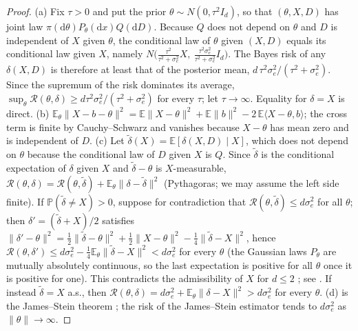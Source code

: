 \documentclass[10pt,a4paper]{article}
\theoremstyle{plain}
\theoremstyle{definition}
\theoremstyle{remark}
\newcommand{\E}{\mathbb{E}}
\newcommand{\Prob}{\mathbb{P}}
\newcommand{\risk}{\mathcal{R}}
\newcommand{\norm}[1]{\lVert #1\rVert}
\newcommand{\ip}[1]{\langle #1\rangle}
\newcommand{\dd}{\mathrm{d}}
\begin{document}
\begin{proof}
(a) Fix $\tau>0$ and put the prior $\theta\sim N(0,\tau^2 I_d)$, so that $(\theta,X,D)$ has joint law $\pi(\dd\theta)P_\theta(\dd x)Q(\dd D)$. Because $Q$ does not depend on $\theta$ and $D$ is independent of $X$ given $\theta$, the conditional law of $\theta$ given $(X,D)$ equals its conditional law given $X$, namely $N\big(\tfrac{\tau^2}{\tau^2+\sigma_e^2}X,\ \tfrac{\tau^2\sigma_e^2}{\tau^2+\sigma_e^2}I_d\big)$. The Bayes risk of any $\delta(X,D)$ is therefore at least that of the posterior mean, $d\,\tau^2\sigma_e^2/(\tau^2+\sigma_e^2)$. Since the supremum of the risk dominates its average, $\sup_\theta\risk(\theta,\delta)\ge d\tau^2\sigma_e^2/(\tau^2+\sigma_e^2)$ for every $\tau$; let $\tau\to\infty$. Equality for $\delta=X$ is direct.
(b) $\E_\theta\norm{X-b-\theta}^2=\E\norm{X-\theta}^2+\E\norm{b}^2-2\,\E\ip{X-\theta,b}$; the cross term is finite by Cauchy--Schwarz and vanishes because $X-\theta$ has mean zero and is independent of $D$.
(c) Let $\tilde\delta(X)=\E[\delta(X,D)\mid X]$, which does not depend on $\theta$ because the conditional law of $D$ given $X$ is $Q$. Since $\tilde\delta$ is the conditional expectation of $\delta$ given $X$ and $\tilde\delta-\theta$ is $X$-measurable, $\risk(\theta,\delta)=\risk(\theta,\tilde\delta)+\E_\theta\norm{\delta-\tilde\delta}^2$ (Pythagoras; we may assume the left side finite). If $\Prob(\tilde\delta\ne X)>0$, suppose for contradiction that $\risk(\theta,\tilde\delta)\le d\sigma_e^2$ for all $\theta$; then $\delta'=(\tilde\delta+X)/2$ satisfies $\norm{\delta'-\theta}^2=\tfrac12\norm{\tilde\delta-\theta}^2+\tfrac12\norm{X-\theta}^2-\tfrac14\norm{\tilde\delta-X}^2$, hence $\risk(\theta,\delta')\le d\sigma_e^2-\tfrac14\E_\theta\norm{\tilde\delta-X}^2<d\sigma_e^2$ for every $\theta$ (the Gaussian laws $P_\theta$ are mutually absolutely continuous, so the last expectation is positive for all $\theta$ once it is positive for one). This contradicts the admissibility of $X$ for $d\le2$ \citep{blyth1951,stein1956}; see \citet[Ch.~5]{lehmanncasella1998}. If instead $\tilde\delta=X$ a.s., then $\risk(\theta,\delta)=d\sigma_e^2+\E_\theta\norm{\delta-X}^2>d\sigma_e^2$ for every $\theta$.
(d) is the James--Stein theorem \citep{stein1956,jamesstein1961}; the risk of the James--Stein estimator tends to $d\sigma_e^2$ as $\norm\theta\to\infty$.
\end{proof}
\end{document}
